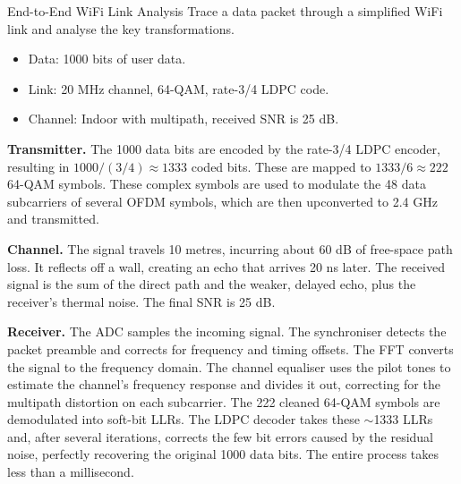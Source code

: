 \begin{workedexample}{End-to-End WiFi Link Analysis}
     Trace a data packet through a simplified WiFi link and analyse the key transformations.
    \begin{itemize}
        \item Data: 1000 bits of user data.
        \item Link: 20 MHz channel, 64-QAM, rate-3/4 LDPC code.
        \item Channel: Indoor with multipath, received SNR is 25 dB.
    \end{itemize}
    
    \begin{derivationsteps}
        \step \textbf{Transmitter.} The 1000 data bits are encoded by the rate-3/4 LDPC encoder, resulting in $1000 / (3/4) \approx 1333$ coded bits. These are mapped to $1333 / 6 \approx 222$ 64-QAM symbols. These complex symbols are used to modulate the 48 data subcarriers of several OFDM symbols, which are then upconverted to 2.4 GHz and transmitted.
        
        \step \textbf{Channel.} The signal travels 10 metres, incurring about 60 dB of free-space path loss. It reflects off a wall, creating an echo that arrives 20 ns later. The received signal is the sum of the direct path and the weaker, delayed echo, plus the receiver's thermal noise. The final SNR is 25 dB.
        
        \step \textbf{Receiver.} The ADC samples the incoming signal. The synchroniser detects the packet preamble and corrects for frequency and timing offsets. The FFT converts the signal to the frequency domain. The channel equaliser uses the pilot tones to estimate the channel's frequency response and divides it out, correcting for the multipath distortion on each subcarrier. The 222 cleaned 64-QAM symbols are demodulated into soft-bit LLRs. The LDPC decoder takes these $\sim$1333 LLRs and, after several iterations, corrects the few bit errors caused by the residual noise, perfectly recovering the original 1000 data bits. The entire process takes less than a millisecond.
    \end{derivationsteps}
\end{workedexample}


